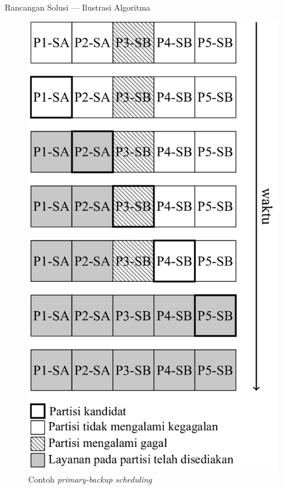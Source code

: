 \documentclass[xetex]{beamer}
\begin{document}
\begin{frame}{Rancangan Solusi --- Ilustrasi Algoritma}
	\centering
	\begin{figure}
		\includegraphics[scale=0.15]{./final-project-figure3.png}
		\caption{Contoh \textit{primary-backup scheduling}}
	\end{figure}
\end{frame}
\end{document}
